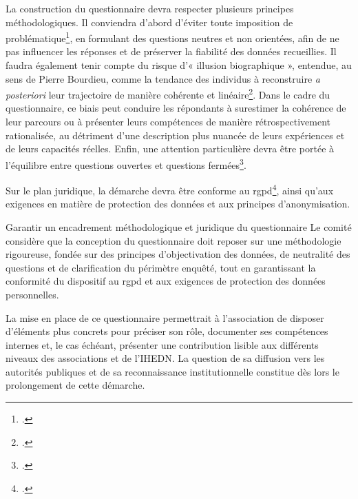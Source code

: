 La construction du questionnaire devra respecter plusieurs principes méthodologiques. Il conviendra d'abord d'éviter toute imposition de problématique\footcite{Bourdieu1986}, en formulant des questions neutres et non orientées, afin de ne pas influencer les réponses et de préserver la fiabilité des données recueillies. Il faudra également tenir compte du risque d'« illusion biographique », entendue, au sens de Pierre Bourdieu, comme la tendance des individus à reconstruire \textit{a posteriori} leur trajectoire de manière cohérente et linéaire\footcite[69]{Bourdieu1986}. Dans le cadre du questionnaire, ce biais peut conduire les répondants à surestimer la cohérence de leur parcours ou à présenter leurs compétences de manière rétrospectivement rationalisée, au détriment d'une description plus nuancée de leurs expériences et de leurs capacités réelles. Enfin, une attention particulière devra être portée à l'équilibre entre questions ouvertes et questions fermées\footcite[65]{Fenneteau2015}.

Sur le plan juridique, la démarche devra être conforme au \gls{rgpd}\footcite{RGPD_CNIL}, ainsi qu'aux exigences en matière de protection des données et aux principes d'anonymisation.

\begin{subproposition}{Garantir un encadrement méthodologique et juridique du questionnaire}
Le comité considère que la conception du questionnaire doit reposer sur une méthodologie rigoureuse, fondée sur des principes d'objectivation des données, de neutralité des questions et de clarification du périmètre enquêté, tout en garantissant la conformité du dispositif au \gls{rgpd} et aux exigences de protection des données personnelles.
\end{subproposition}

La mise en place de ce questionnaire permettrait à l'association de disposer d'éléments plus concrets pour préciser son rôle, documenter ses compétences internes et, le cas échéant, présenter une contribution lisible aux différents niveaux des associations et de l'IHEDN. La question de sa diffusion vers les autorités publiques et de sa reconnaissance institutionnelle constitue dès lors le prolongement de cette démarche.
